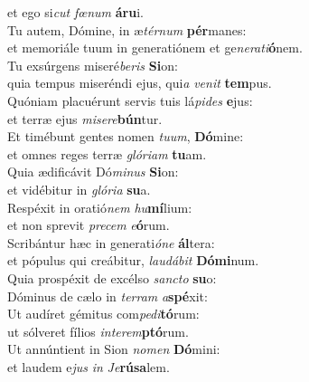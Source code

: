 \evenverse et ego si\textit{cut} \textit{fœ}\textit{num} \textbf{á}\textbf{ru}i.\\
\oddverse Tu autem, Dómine, in æ\textit{tér}\textit{num} \textbf{pér}manes:~\*\\
\oddverse et memoriále tuum in generatiónem et ge\textit{ne}\textit{ra}\textit{ti}\textbf{ó}nem.\\
\evenverse Tu exsúrgens miseré\textit{be}\textit{ris} \textbf{Si}on:~\*\\
\evenverse quia tempus miseréndi ejus, qui\textit{a} \textit{ve}\textit{nit} \textbf{tem}pus.\\
\oddverse Quóniam placuérunt servis tuis lá\textit{pi}\textit{des} \textbf{e}jus:~\*\\
\oddverse et terræ ejus \textit{mi}\textit{se}\textit{re}\textbf{bún}tur.\\
\evenverse Et timébunt gentes nomen \textit{tu}\textit{um}, \textbf{Dó}mine:~\*\\
\evenverse et omnes reges terræ \textit{gló}\textit{ri}\textit{am} \textbf{tu}am.\\
\oddverse Quia ædificávit Dó\textit{mi}\textit{nus} \textbf{Si}on:~\*\\
\oddverse et vidébitur in \textit{gló}\textit{ri}\textit{a} \textbf{su}a.\\
\evenverse Respéxit in oratió\textit{nem} \textit{hu}\textbf{mí}lium:~\*\\
\evenverse et non sprevit \textit{pre}\textit{cem} \textit{e}\textbf{ó}rum.\\
\oddverse Scribántur hæc in generati\textit{ó}\textit{ne} \textbf{ál}tera:~\*\\
\oddverse et pópulus qui creábitur, \textit{lau}\textit{dá}\textit{bit} \textbf{Dó}\textbf{mi}num.\\
\evenverse Quia prospéxit de excélso \textit{san}\textit{cto} \textbf{su}o:~\*\\
\evenverse Dóminus de cælo in \textit{ter}\textit{ram} \textit{a}\textbf{spé}xit:\\
\oddverse Ut audíret gémitus com\textit{pe}\textit{di}\textbf{tó}rum:~\*\\
\oddverse ut sólveret fílios \textit{in}\textit{te}\textit{rem}\textbf{ptó}rum.\\
\evenverse Ut annúntient in Sion \textit{no}\textit{men} \textbf{Dó}mini:~\*\\
\evenverse et laudem e\textit{jus} \textit{in} \textit{Je}\textbf{rú}\textbf{sa}lem.\\
